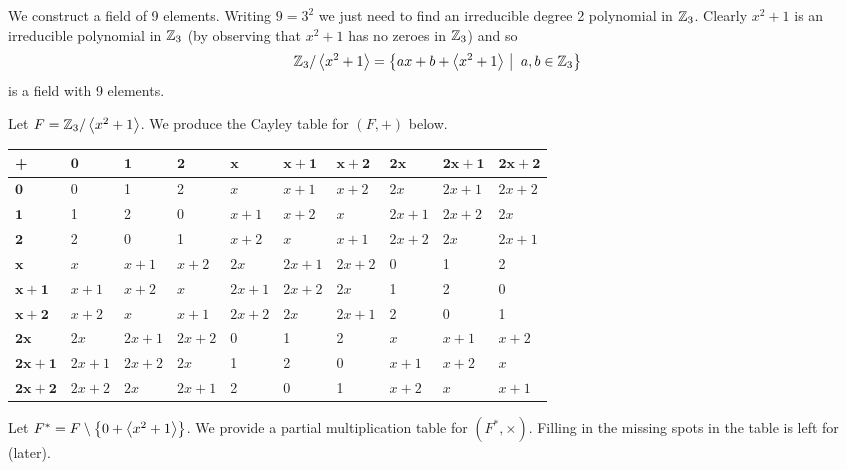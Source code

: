 \begin{example}\label{example-Z3/<x^2+1>}
    We construct a field of 9 elements. Writing $9 = 3^2$ we just need to find an irreducible degree 2 polynomial in $\mathbb{Z}_3$. Clearly $x^2 + 1$ is an irreducible polynomial in $\mathbb{Z}_3$ (by observing that $x^2 + 1$ has no zeroes in $\mathbb{Z}_3$) and so
    \[
        \Z_3/\princ{x^2+1} = \left\{ax+b + \princ{x^2+1} \vert a,b \in \Z_3\right\}
    \]
    is a field with 9 elements.

    \newpage

    Let $F = \mathbb{Z}_3/\left\langle x^2+1\right\rangle$. We produce the Cayley table for $(F, +)$ below.
    \begin{table}[H]
        \centering
        \fontsize{9pt}{12pt}\selectfont
        \begin{tabular}{|l|l|l|l|l|l|l|l|l|l|}
            \hline
            \textbf{+} & $\boldsymbol{0}$ & $\boldsymbol{1}$ & $\boldsymbol{2}$ & $\boldsymbol{x}$ & $\boldsymbol{x+1}$ & $\boldsymbol{x+2}$ & $\boldsymbol{2x}$ & $\boldsymbol{2x+1}$ & $\boldsymbol{2x+2}$ \\ \hline
            $\boldsymbol{0}$ & 0 & 1 & 2 & $x$ & $x+1$ & $x+2$ & $2x$ & $2x+1$ & $2x+2$ \\ \hline
            $\boldsymbol{1}$ & 1 & 2 & 0 & $x+1$ & $x+2$ & $x$ & $2x+1$ & $2x+2$ & $2x$ \\ \hline
            $\boldsymbol{2}$ & 2 & 0 & 1 & $x+2$ & $x$ & $x+1$ & $2x+2$ & $2x$ & $2x+1$ \\ \hline
            $\boldsymbol{x}$ & $x$ & $x+1$ & $x+2$ & $2x$ & $2x+1$ & $2x+2$ & 0 & 1 & 2 \\ \hline
            $\boldsymbol{x+1}$ & $x+1$ & $x+2$ & $x$ & $2x+1$ & $2x+2$ & $2x$ & 1 & 2 & 0 \\ \hline
            $\boldsymbol{x+2}$ & $x+2$ & $x$ & $x+1$ & $2x+2$ & $2x$ & $2x+1$ & 2 & 0 & 1 \\ \hline
            $\boldsymbol{2x}$ & $2x$ & $2x+1$ & $2x+2$ & 0 & 1 & 2 & $x$ & $x+1$ & $x+2$ \\ \hline
            $\boldsymbol{2x+1}$ & $2x+1$ & $2x+2$ & $2x$ & 1 & 2 & 0 & $x+1$ & $x+2$ & $x$ \\ \hline
            $\boldsymbol{2x+2}$ & $2x+2$ & $2x$ & $2x+1$ & 2 & 0 & 1 & $x+2$ & $x$ & $x+1$ \\ \hline
        \end{tabular}
    \end{table}

    Let $F^\ast = F \setminus \left\{0 + \left\langle x^2+1\right\rangle\right\}$. We provide a partial multiplication table for $(F^\ast, \times)$. Filling in the missing spots in the table is left for  (later).


\end{example}
